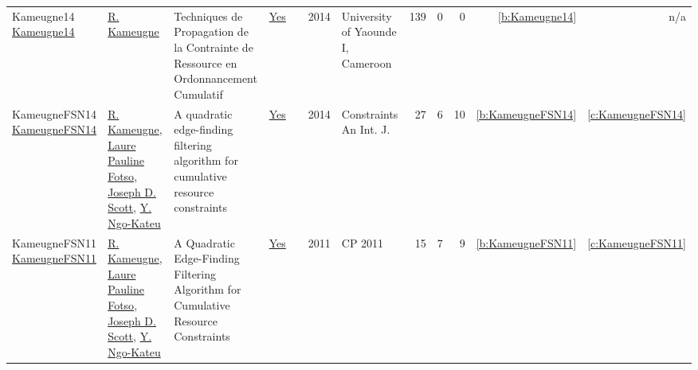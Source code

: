 {\begin{longtable}{>{\raggedright\arraybackslash}p{3cm}>{\raggedright\arraybackslash}p{6cm}>{\raggedright\arraybackslash}p{6.5cm}rrrp{2.5cm}rrrrr}
Kameugne14 \href{http://cp2013.a4cp.org/sites/default/files/roger_kameugne_-_propagation_techniques_of_resource_constraint_for_cumulative_scheduling.pdf}{Kameugne14} & \hyperref[auth:a10]{R. Kameugne} & Techniques de Propagation de la Contrainte de Ressource en Ordonnancement Cumulatif & \href{../works/Kameugne14.pdf}{Yes} & \cite{Kameugne14} & 2014 & University of Yaounde I, Cameroon & 139 & 0 & 0 & \ref{b:Kameugne14} & n/a\\
KameugneFSN14 \href{https://doi.org/10.1007/s10601-013-9157-z}{KameugneFSN14} & \hyperref[auth:a10]{R. Kameugne}, \hyperref[auth:a131]{Laure Pauline Fotso}, \hyperref[auth:a132]{Joseph D. Scott}, \hyperref[auth:a133]{Y. Ngo{-}Kateu} & A quadratic edge-finding filtering algorithm for cumulative resource constraints & \href{../works/KameugneFSN14.pdf}{Yes} & \cite{KameugneFSN14} & 2014 & Constraints An Int. J. & 27 & 6 & 10 & \ref{b:KameugneFSN14} & \ref{c:KameugneFSN14}\\
KameugneFSN11 \href{https://doi.org/10.1007/978-3-642-23786-7\_37}{KameugneFSN11} & \hyperref[auth:a10]{R. Kameugne}, \hyperref[auth:a131]{Laure Pauline Fotso}, \hyperref[auth:a132]{Joseph D. Scott}, \hyperref[auth:a133]{Y. Ngo{-}Kateu} & A Quadratic Edge-Finding Filtering Algorithm for Cumulative Resource Constraints & \href{../works/KameugneFSN11.pdf}{Yes} & \cite{KameugneFSN11} & 2011 & CP 2011 & 15 & 7 & 9 & \ref{b:KameugneFSN11} & \ref{c:KameugneFSN11}\\
\end{longtable}
}

\clearpage
